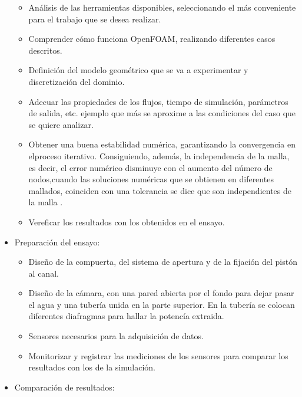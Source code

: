 \begin{itemize}
  \begin{itemize}
  \item
    Análisis de las herramientas disponibles, seleccionando el más
    conveniente para el trabajo que se desea realizar.
  \item
    Comprender cómo funciona OpenFOAM, realizando diferentes casos
    descritos.
  \item
    Definición del modelo geométrico que se va a experimentar y
    discretización del dominio.
  \item
    Adecuar las propiedades de los flujos, tiempo de simulación,
    parámetros de salida, etc. ejemplo que más se aproxime a las
    condiciones del caso que se quiere analizar.
  \item
    Obtener una buena estabilidad numérica, garantizando la convergencia
    en elproceso iterativo. Consiguiendo, además, la independencia de la
    malla, es decir, el error numérico disminuye con el aumento del
    número de nodos,cuando las soluciones numéricas que se obtienen en
    diferentes mallados, coinciden con una tolerancia se dice que son
    independientes de la malla
    \cite{ferziger02}.
  \item
    Vereficar los resultados con los obtenidos en el ensayo.
  \end{itemize}
\item
  Preparación del ensayo:

  \begin{itemize}
  \item
    Diseño de la compuerta, del sistema de apertura y de la fijación del
    pistón al canal.
  \item
    Diseño de la cámara, con una pared abierta por el fondo para dejar
    pasar el agua y una tubería unida en la parte superior. En la
    tubería se colocan diferentes diafragmas para hallar la potencía
    extraida. 
  \item
    Sensores necesarios para la adquisición de datos.
  \item
    Monitorizar y registrar las mediciones de los sensores para comparar
    los resultados con los de la simulación.
  \end{itemize}
\item
  Comparación de resultados:


\end{itemize}
